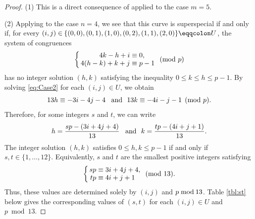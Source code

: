 \documentclass{article}
\theoremstyle{definition}
\begin{document}
\begin{proof}
(1) This is a direct consequence of \cite[Corollary 1]{KW} applied to the case $m=5$.\par
\hspace{5.8mm}(2) Applying \cite[Proposition 4.1]{MS} to the case $n=4$, we see that this curve is superspecial if and only if, for every $(i,j) \in\hspace{-0.2mm} \{(0,0),(0,1),(1,0),(0,2),(1,1),(2,0)\} \eqqcolon U$, the system of congruences
\begin{equation}\label{eq:Case2}
    \left\{\,
    \begin{aligned}
        4k-h+i &\equiv 0,\\[-1.2mm]
        4(h-k)+k+j &\equiv p-1
    \end{aligned}
    \right. \pmod{p}\vspace{-0.2mm}
\end{equation}
has no integer solution $(h,k)$ satisfying the inequality $0 \leq k \leq h \leq p-1$.
By solving \eqref{eq:Case2} for each $(i,j) \in U$, we obtain\vspace{-0.7mm}
\[
    13h \equiv -3i-4j-4 \ \,\text{ and }\ 13k \equiv -4i-j-1 \pmod{p}.\vspace{1.2mm}
\]
Therefore, for some integers $s$ and $t$, we can write\vspace{-0.9mm}
\[
    h = \frac{sp-(3i+4j+4)}{13} \ \,\text{ and }\ k = \frac{tp-(4i+j+1)}{13}.\vspace{0.8mm}
\]
The integer solution $(h,k)$ satisfies $0 \leq h,k \leq p-1 $ if and only if $s,t \in \{1,\dots,12\}$. Equivalently, $s$ and $t$ are the smallest positive integers satisfying\vspace{-0.4mm}
\[
    \left\{\,
    \begin{aligned}
        sp &\equiv 3i+4j+4,\\[-1.2mm]
        tp &\equiv 4i+j+1
    \end{aligned}
    \right. \pmod{13}.\vspace{-0.1mm}
\]
Thus, these values are determined solely by $(i,j)$ and $p \bmod\hspace{-0.2mm} 13$.
Table \ref{tbl:st} below gives the corresponding values of $(s,t)$ for each $(i,j) \in U$ and $p \bmod{13}$.


\end{proof}
\end{document}
